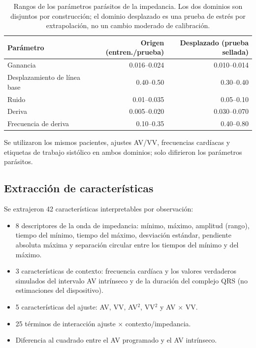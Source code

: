 \documentclass[11pt,a4paper]{article}
\begin{document}
\begin{table}[htbp]
\centering
\small
\caption{Rangos de los parámetros parásitos de la impedancia. Los dos dominios
son disjuntos por construcción; el dominio desplazado es una prueba de estrés
por extrapolación, no un cambio moderado de calibración.}
\label{tab:domains}
\begin{tabular}{@{}lrr@{}}
\toprule
Parámetro & Origen (entren./prueba) & Desplazado (prueba sellada) \\
\midrule
Ganancia & 0.016--0.024 & 0.010--0.014 \\
Desplazamiento de línea base & 0.40--0.50 & 0.30--0.40 \\
Ruido & 0.01--0.035 & 0.05--0.10 \\
Deriva & 0.005--0.020 & 0.030--0.070 \\
Frecuencia de deriva & 0.10--0.35 & 0.40--0.80 \\
\bottomrule
\end{tabular}
\end{table}

Se utilizaron los mismos pacientes, ajustes AV/VV, frecuencias cardíacas y
etiquetas de trabajo sistólico en ambos dominios; solo difirieron los parámetros
parásitos.

\subsection{Extracción de características}

Se extrajeron 42 características interpretables por observación:
\begin{itemize}[leftmargin=1.5em,itemsep=0.2em]
  \item 8 descriptores de la onda de impedancia: mínimo, máximo, amplitud
        (rango), tiempo del mínimo, tiempo del máximo, desviación estándar,
        pendiente absoluta máxima y separación circular entre los tiempos del
        mínimo y del máximo.
  \item 3 características de contexto: frecuencia cardíaca y los valores
        verdaderos simulados del intervalo AV intrínseco y de la duración del
        complejo QRS (no estimaciones del dispositivo).
  \item 5 características del ajuste: AV, VV, AV$^2$, VV$^2$ y AV $\times$ VV.
  \item 25 términos de interacción ajuste $\times$ contexto/impedancia.
  \item Diferencia al cuadrado entre el AV programado y el AV intrínseco.
\end{itemize}
\end{document}
